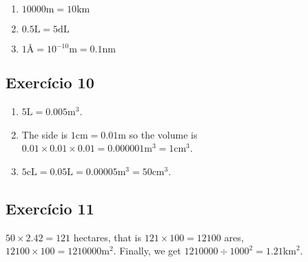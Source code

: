 \begin{enumerate}
  \item $10000 \text{m} = 10\text{km}$
  \item $0.5 \text{L}  = 5 \text{dL}$
  \item $1 \text{Å} = 10^{-10} \text{m} = 0.1 \text{nm}$
\end{enumerate}

\subsection*{Exercício 10}

\begin{enumerate}

\item $5 \text{L} = 0.005 \text{m}^3$.

\item The side is $1\text{cm} = 0.01 \text{m}$ so the volume is
  $0.01 \times 0.01 \times 0.01 = 0.000001 \text{m}^3 = 1 \text{cm}^3$.

\item $5 \text{cL} = 0.05 \text{L} = 0.00005 \text{m}^3 = 50 \text{cm}^3$.

\end{enumerate}

\subsection*{Exercício 11}

$50 \times 2.42 = 121$ hectares, that is $121 \times 100 = 12100$ ares,
$12100 \times 100 = 1210000 \text{m}^2$. Finally, we get
$1210000 \div 1000^2 = 1.21 \text{km}^2$.
